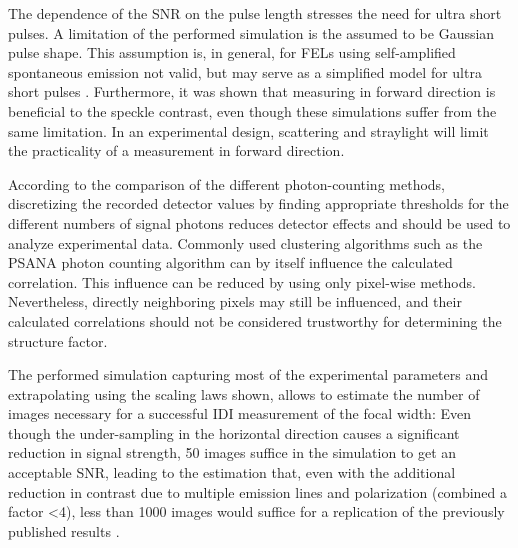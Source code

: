 The dependence of the SNR on the pulse length stresses the need for ultra short pulses. A limitation of the performed simulation is the assumed to be Gaussian pulse shape. This assumption is, in general, for FELs using self-amplified spontaneous emission not valid, but may serve as a simplified model for ultra short pulses \cite{inoue2019}. Furthermore, it was shown that measuring in forward direction is beneficial to the speckle contrast, even though these simulations suffer from the same limitation.  In an experimental design, scattering and straylight will limit the practicality of a measurement in forward direction.

According to the comparison of the different photon-counting methods, discretizing the recorded detector values by finding appropriate thresholds for the different numbers of signal photons reduces detector effects and should be used to analyze experimental data. Commonly used clustering algorithms such as the PSANA photon counting algorithm can by itself influence the calculated correlation. This influence can be reduced by using only pixel-wise methods. Nevertheless, directly neighboring pixels may still be influenced, and their calculated correlations should not be considered trustworthy for determining the structure factor.


The performed simulation capturing most of the experimental parameters and extrapolating using the scaling laws shown, allows to estimate the number of images necessary for a successful IDI measurement of the focal width: Even though the under-sampling in the horizontal direction causes a significant reduction in signal strength, 50 images suffice in the simulation to get an acceptable SNR, leading to the estimation that, even with the additional reduction in contrast due to multiple emission lines and polarization (combined a factor <4), less than 1000 images would suffice for a replication of the previously published results \cite{nakumura2020}.

